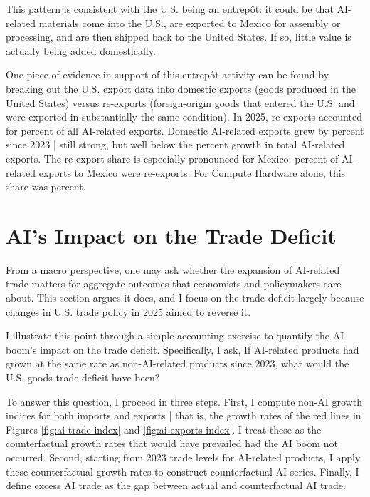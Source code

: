 \documentclass[12pt,pdftex]{article}
\begin{document}
\begin{onehalfspacing}
This pattern is consistent with the U.S. being an entrep\^{o}t: it could be that AI-related materials come into the U.S., are exported to Mexico for assembly or processing, and are then shipped back to the United States. If so, little value is actually being added domestically.

One piece of evidence in support of this entrep\^{o}t activity can be found by breaking out the U.S. export data into domestic exports (goods produced in the United States) versus re-exports (foreign-origin goods that entered the U.S. and were exported in substantially the same condition). In 2025, re-exports accounted for \aiReexportShare{} percent of all AI-related exports. Domestic AI-related exports grew by \domesticAiExportGrowth{} percent since 2023 | still strong, but well below the \aiExportGrowth{} percent growth in total AI-related exports. The re-export share is especially pronounced for Mexico: \mexicoAiReexportShare{} percent of AI-related exports to Mexico were re-exports. For Compute Hardware alone, this share was \mexicoComputeReexportShare{} percent.

\section*{AI's Impact on the Trade Deficit}\label{sec:trade-deficit}

From a macro perspective, one may ask whether the expansion of AI-related trade matters for aggregate outcomes that economists and policymakers care about. This section argues it does, and I focus on the trade deficit largely because changes in U.S. trade policy in 2025 aimed to reverse it.

\afterpage{%
\clearpage

}

I illustrate this point through a simple accounting exercise to quantify the AI boom's impact on the trade deficit. Specifically, I ask, If AI-related products had grown at the same rate as non-AI-related products since 2023, what would the U.S. goods trade deficit have been?

To answer this question, I proceed in three steps. First, I compute non-AI growth indices for both imports and exports | that is, the growth rates of the red lines in Figures \ref{fig:ai-trade-index} and \ref{fig:ai-exports-index}. I treat these as the counterfactual growth rates that would have prevailed had the AI boom not occurred. Second, starting from 2023 trade levels for AI-related products, I apply these counterfactual growth rates to construct counterfactual AI series. Finally, I define excess AI trade as the gap between actual and counterfactual AI trade.


\end{onehalfspacing}
\end{document}
